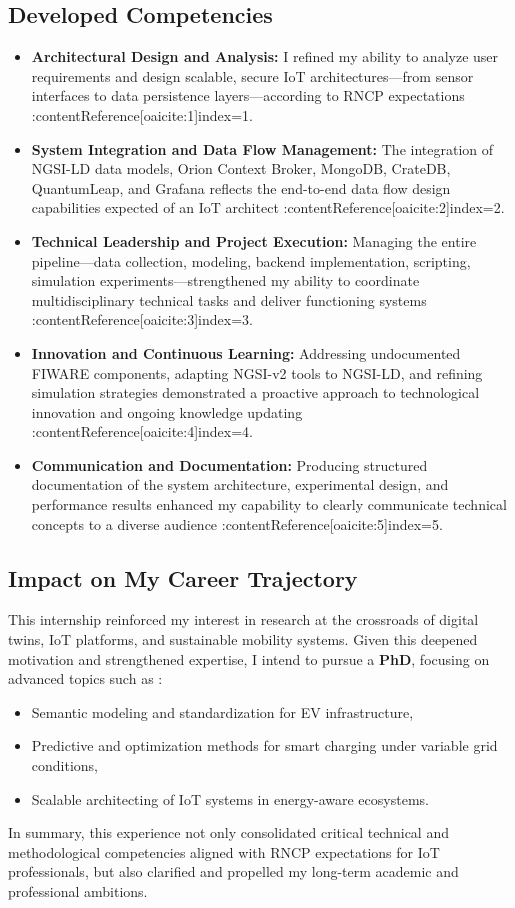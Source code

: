 \subsection*{Developed Competencies}
\begin{itemize}
  \item \textbf{Architectural Design and Analysis:} I refined my ability to analyze user requirements and design scalable, secure IoT architectures—from sensor interfaces to data persistence layers—according to RNCP expectations :contentReference[oaicite:1]{index=1}.
  \item \textbf{System Integration and Data Flow Management:} The integration of NGSI-LD data models, Orion Context Broker, MongoDB, CrateDB, QuantumLeap, and Grafana reflects the end-to-end data flow design capabilities expected of an IoT architect :contentReference[oaicite:2]{index=2}.
  \item \textbf{Technical Leadership and Project Execution:} Managing the entire pipeline—data collection, modeling, backend implementation, scripting, simulation experiments—strengthened my ability to coordinate multidisciplinary technical tasks and deliver functioning systems :contentReference[oaicite:3]{index=3}.
  \item \textbf{Innovation and Continuous Learning:} Addressing undocumented FIWARE components, adapting NGSI-v2 tools to NGSI-LD, and refining simulation strategies demonstrated a proactive approach to technological innovation and ongoing knowledge updating :contentReference[oaicite:4]{index=4}.
  \item \textbf{Communication and Documentation:} Producing structured documentation of the system architecture, experimental design, and performance results enhanced my capability to clearly communicate technical concepts to a diverse audience :contentReference[oaicite:5]{index=5}.
\end{itemize}

\subsection*{Impact on My Career Trajectory}
This internship reinforced my interest in research at the crossroads of digital twins, IoT platforms, and sustainable mobility systems.  
Given this deepened motivation and strengthened expertise, I intend to pursue a \textbf{PhD}, focusing on advanced topics such as :
\begin{itemize}
  \item Semantic modeling and standardization for EV infrastructure,
  \item Predictive and optimization methods for smart charging under variable grid conditions,
  \item Scalable architecting of IoT systems in energy-aware ecosystems.
\end{itemize}

In summary, this experience not only consolidated critical technical and methodological competencies aligned with RNCP expectations for IoT professionals, but also clarified and propelled my long-term academic and professional ambitions.
